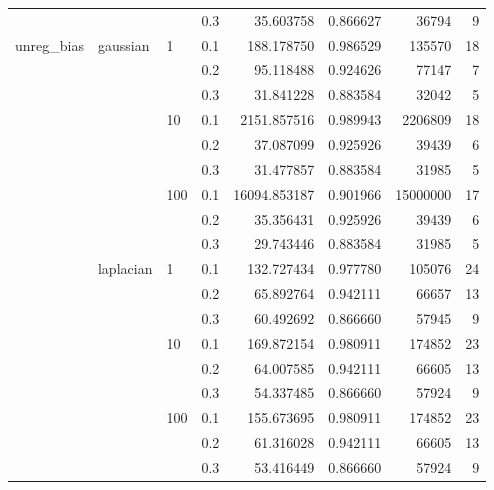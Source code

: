 \begin{table}[H]
\begin{tabular}{llllrrrr}
           &           &     & 0.3 &     35.603758 &  0.866627 &     36794 &     9 \\
unreg\_bias & gaussian & 1   & 0.1 &    188.178750 &  0.986529 &    135570 &    18 \\
           &           &     & 0.2 &     95.118488 &  0.924626 &     77147 &     7 \\
           &           &     & 0.3 &     31.841228 &  0.883584 &     32042 &     5 \\
           &           & 10  & 0.1 &   2151.857516 &  0.989943 &   2206809 &    18 \\
           &           &     & 0.2 &     37.087099 &  0.925926 &     39439 &     6 \\
           &           &     & 0.3 &     31.477857 &  0.883584 &     31985 &     5 \\
           &           & 100 & 0.1 &  16094.853187 &  0.901966 &  15000000 &    17 \\
           &           &     & 0.2 &     35.356431 &  0.925926 &     39439 &     6 \\
           &           &     & 0.3 &     29.743446 &  0.883584 &     31985 &     5 \\
           & laplacian & 1   & 0.1 &    132.727434 &  0.977780 &    105076 &    24 \\
           &           &     & 0.2 &     65.892764 &  0.942111 &     66657 &    13 \\
           &           &     & 0.3 &     60.492692 &  0.866660 &     57945 &     9 \\
           &           & 10  & 0.1 &    169.872154 &  0.980911 &    174852 &    23 \\
           &           &     & 0.2 &     64.007585 &  0.942111 &     66605 &    13 \\
           &           &     & 0.3 &     54.337485 &  0.866660 &     57924 &     9 \\
           &           & 100 & 0.1 &    155.673695 &  0.980911 &    174852 &    23 \\
           &           &     & 0.2 &     61.316028 &  0.942111 &     66605 &    13 \\
           &           &     & 0.3 &     53.416449 &  0.866660 &     57924 &     9 \\
\bottomrule
\end{tabular}
\end{table}
